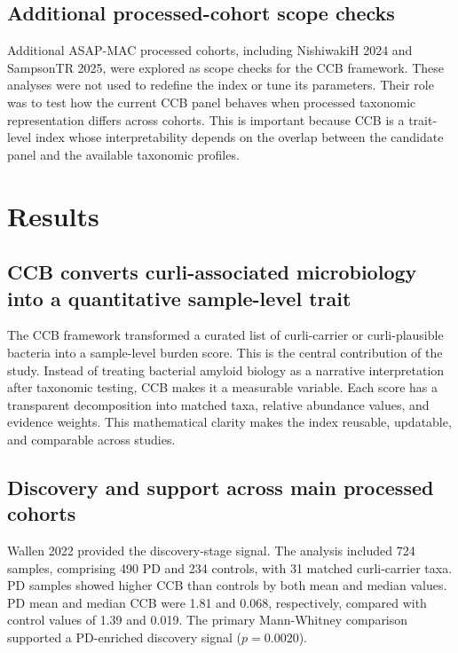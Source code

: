 \documentclass[11pt]{article}
\begin{document}
\subsection*{Additional processed-cohort scope checks}

Additional ASAP-MAC processed cohorts, including NishiwakiH 2024 and SampsonTR 2025, were explored as scope checks for the CCB framework. These analyses were not used to redefine the index or tune its parameters. Their role was to test how the current CCB panel behaves when processed taxonomic representation differs across cohorts. This is important because CCB is a trait-level index whose interpretability depends on the overlap between the candidate panel and the available taxonomic profiles.

\section*{Results}

\subsection*{CCB converts curli-associated microbiology into a quantitative sample-level trait}

The CCB framework transformed a curated list of curli-carrier or curli-plausible bacteria into a sample-level burden score. This is the central contribution of the study. Instead of treating bacterial amyloid biology as a narrative interpretation after taxonomic testing, CCB makes it a measurable variable. Each score has a transparent decomposition into matched taxa, relative abundance values, and evidence weights. This mathematical clarity makes the index reusable, updatable, and comparable across studies.

\subsection*{Discovery and support across main processed cohorts}

Wallen 2022 provided the discovery-stage signal. The analysis included 724 samples, comprising 490 PD and 234 controls, with 31 matched curli-carrier taxa. PD samples showed higher CCB than controls by both mean and median values. PD mean and median CCB were 1.81 and 0.068, respectively, compared with control values of 1.39 and 0.019. The primary Mann-Whitney comparison supported a PD-enriched discovery signal ($p=0.0020$).
\end{document}
